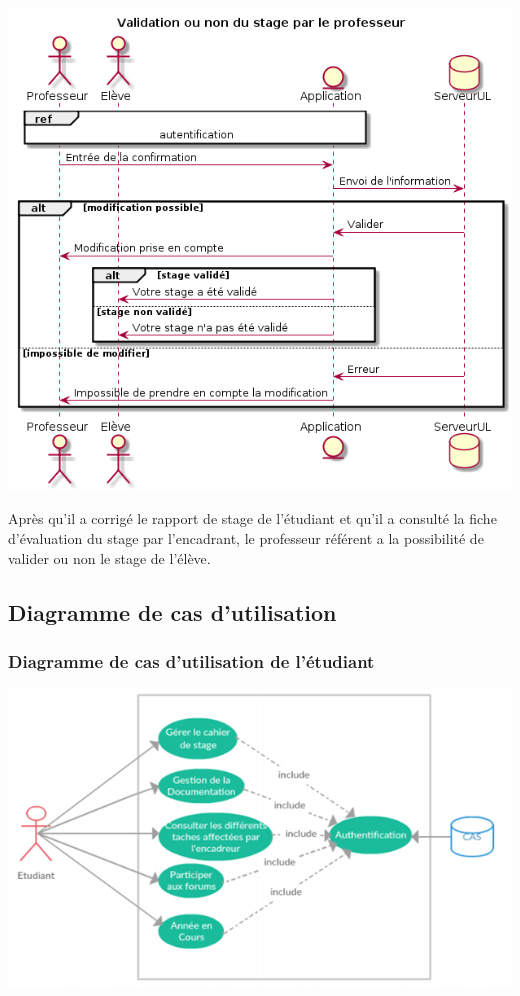 \documentclass{scrreprt}
\begin{document}
\begin{center}
	\includegraphics[scale=0.55]{image/validationStage.png}
\end{center}
\hspace{1cm}Après qu'il a corrigé le rapport de stage de l'étudiant et qu'il a consulté la fiche d'évaluation du stage par l'encadrant, le professeur référent a la possibilité de valider ou non le stage de l'élève.

\subsection{Diagramme de cas d'utilisation}
\subsubsection{Diagramme de cas d'utilisation de l'étudiant}
\begin{center}
	\includegraphics[scale=0.55]{image/casutilisationetudiant.png}
\end{center}
\end{document}
